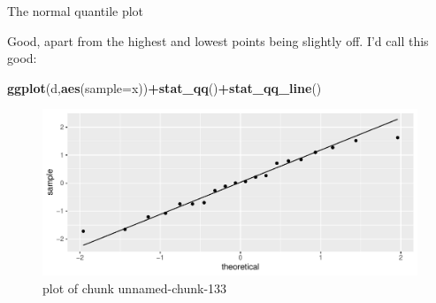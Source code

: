 \documentclass[ignorenonframetext,]{beamer}
\newenvironment{Shaded}{\begin{snugshade}}{\end{snugshade}}
\newcommand{\DataTypeTok}[1]{\textcolor[rgb]{0.13,0.29,0.53}{#1}}
\newcommand{\KeywordTok}[1]{\textcolor[rgb]{0.13,0.29,0.53}{\textbf{#1}}}
\newcommand{\NormalTok}[1]{#1}
\newcommand{\OperatorTok}[1]{\textcolor[rgb]{0.81,0.36,0.00}{\textbf{#1}}}
\begin{document}
\begin{frame}[fragile]{The normal quantile plot}
\protect\hypertarget{the-normal-quantile-plot-2}{}

Good, apart from the highest and lowest points being slightly off. I'd
call this good:

\begin{Shaded}
\begin{Highlighting}[]
\KeywordTok{ggplot}\NormalTok{(d,}\KeywordTok{aes}\NormalTok{(}\DataTypeTok{sample=}\NormalTok{x))}\OperatorTok{+}\KeywordTok{stat_qq}\NormalTok{()}\OperatorTok{+}\KeywordTok{stat_qq_line}\NormalTok{()}
\end{Highlighting}
\end{Shaded}

\begin{figure}
\centering
\includegraphics{figure/unnamed-chunk-133-1.pdf}
\caption{plot of chunk unnamed-chunk-133}
\end{figure}

\end{frame}
\end{document}
